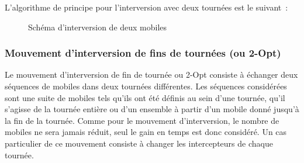 			L'algorithme de principe pour l'interversion avec deux tournées est le suivant :
			\begin{code}
				\begin{algo}[informal]
					\BEGIN
									\ENDFORGEN
								\ENDFORGEN
							\ENDFORGEN
						\ENDFORGEN
					\END
				\end{algo}
			\end{code}


			\begin{figure}[h!]
			\begin{subfigure}[b]{.54\linewidth}
				\centering
				\begin{tikzpicture}[schema]
					
				\end{tikzpicture}
				\label{subfig:move_swap1route}
			\end{subfigure}
			\hfill
			\begin{subfigure}[b]{.45\linewidth}
				\centering
				\begin{tikzpicture}[schema]
					
				\end{tikzpicture}
				\label{subfig:move_swap2routes}
			\end{subfigure}
			\caption{Schéma d'interversion de deux mobiles}
			\label{fig:move_swap}
			\end{figure}

		\subsubsection{Mouvement d'interversion de fins de tournées (ou 2-Opt)}
			Le mouvement d'interversion de fin de tournée ou 2-Opt consiste à échanger deux séquences de mobiles dans deux tournées différentes. Les séquences considérées sont une suite de mobiles tels qu'ils ont été définis au sein d'une tournée, qu'il s'agisse de la tournée entière ou d'un ensemble à partir d'un mobile donné jusqu'à la fin de la tournée. Comme pour le mouvement d'interversion, le nombre de mobiles ne sera jamais réduit, seul le gain en temps est donc considéré. Un cas particulier de ce mouvement consiste à changer les intercepteurs de chaque tournée.

